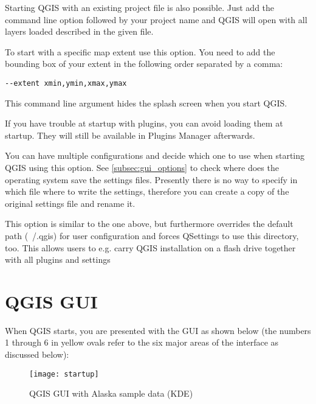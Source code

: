 Starting QGIS with an existing project file is also possible. Just
add the command line option  followed by your project
name and QGIS will open with all layers loaded described in the given file.

To start with a specific map extent use this option. You need to add the bounding box of your extent in the following order separated by a comma:
\begin{verbatim}
--extent xmin,ymin,xmax,ymax
\end{verbatim}

This command line argument hides the splash screen when you start QGIS.

If you have trouble at startup with plugins, you can avoid loading them at startup. They will still be available in Plugins Manager afterwards.

You can have multiple configurations and decide which one to use when starting QGIS using this option. See \ref{subsec:gui_options} to check where does the operating system save the settings files. Presently there is no way to specify in which file where to write the settings, therefore you can create a copy of the original settings file and rename it.

This option is similar to the one above, but furthermore overrides the default path (~/.qgis) for user configuration and forces QSettings to use this directory, too. This allows users to e.g. carry QGIS installation on a flash drive together with all plugins and settings

\section{QGIS GUI}
\label{label_qgismainwindow}

When QGIS starts, you are presented with the GUI as shown below
(the numbers 1 through 6 in yellow ovals refer to the six major areas of the
interface as discussed below):

\begin{figure}[ht]
   \centering
    \texttt{[image: startup]}
    \caption{QGIS GUI with Alaska sample data \nixcaption (KDE)} \label{fig:startup}
\end{figure}

